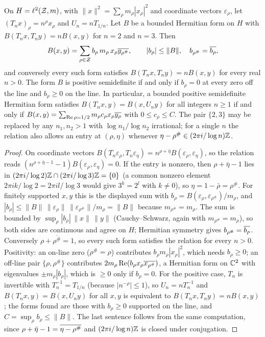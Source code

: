\begin{lemma}\label{lem:PTQ}
On $H=\ell^2(\mathcal{Z},m)$, with $\|x\|^2=\sum_\rho m_\rho|x_\rho|^2$ and coordinate vectors $\varepsilon_\rho$, let $(T_nx)_\rho=n^\rho x_\rho$ and $U_n=nT_{1/n}$. Let $B$ be a bounded Hermitian form on $H$ with $B(T_nx,T_ny)=nB(x,y)$ for $n=2$ and $n=3$. Then
\[
B(x,y)=\sum_{\rho\in\mathcal{Z}}b_\rho\,m_\rho\,x_\rho\overline{y_{\rho^\#}},\qquad|b_\rho|\le\|B\|,\quad b_{\rho^\#}=\overline{b_\rho},
\]
and conversely every such form satisfies $B(T_nx,T_ny)=nB(x,y)$ for every real $n>0$. The form $B$ is positive semidefinite if and only if $b_\rho=0$ at every zero off the line and $b_\rho\ge0$ on the line. In particular, a bounded positive semidefinite Hermitian form satisfies $B(T_nx,y)=B(x,U_ny)$ for all integers $n\ge1$ if and only if $B(x,y)=\sum_{\operatorname{Re}\rho=1/2}m_\rho c_\rho x_\rho\overline{y_\rho}$ with $0\le c_\rho\le C$.
The pair $\{2,3\}$ may be replaced by any $n_1,n_2>1$ with $\log n_1/\log n_2$ irrational; for a single $n$ the relation also allows an entry at $(\rho,\eta)$ whenever $\eta-\rho^\#\in(2\pi i/\log n)\mathbb{Z}$.
\end{lemma}

\begin{proof}
On coordinate vectors $B(T_n\varepsilon_\rho,T_n\varepsilon_\eta)=n^{\rho+\bar\eta}B(\varepsilon_\rho,\varepsilon_\eta)$, so the relation reads $(n^{\rho+\bar\eta-1}-1)B(\varepsilon_\rho,\varepsilon_\eta)=0$. If the entry is nonzero, then $\rho+\bar\eta-1$ lies in $(2\pi i/\log2)\mathbb{Z}\cap(2\pi i/\log3)\mathbb{Z}=\{0\}$ (a common nonzero element $2\pi ik/\log2=2\pi il/\log3$ would give $3^k=2^l$ with $k\ne0$), so $\eta=1-\bar\rho=\rho^\#$. For finitely supported $x,y$ this is the displayed sum with $b_\rho=B(\varepsilon_\rho,\varepsilon_{\rho^\#})/m_\rho$, and $|b_\rho|\le\|B\|\,\|\varepsilon_\rho\|\,\|\varepsilon_{\rho^\#}\|/m_\rho=\|B\|$ because $m_{\rho^\#}=m_\rho$. The sum is bounded by $\sup_\rho|b_\rho|\,\|x\|\,\|y\|$ (Cauchy--Schwarz, again with $m_{\rho^\#}=m_\rho$), so both sides are continuous and agree on $H$; Hermitian symmetry gives $b_{\rho^\#}=\overline{b_\rho}$. Conversely $\rho+\overline{\rho^\#}=1$, so every such form satisfies the relation for every $n>0$.
Positivity: an on-line zero ($\rho^\#=\rho$) contributes $b_\rho m_\rho|x_\rho|^2$, which needs $b_\rho\ge0$; an off-line pair $\{\rho,\rho^\#\}$ contributes $2m_\rho\operatorname{Re}(b_\rho x_\rho\overline{x_{\rho^\#}})$, a Hermitian form on $\mathbb{C}^2$ with eigenvalues $\pm m_\rho|b_\rho|$, which is $\ge0$ only if $b_\rho=0$.
For the positive case, $T_n$ is invertible with $T_n^{-1}=T_{1/n}$ (because $|n^{-\rho}|\le1$), so $U_n=nT_n^{-1}$ and $B(T_nx,y)=B(x,U_ny)$ for all $x,y$ is equivalent to $B(T_nx,T_ny)=nB(x,y)$; the forms found are those with $b_\rho\ge0$ supported on the line, and $C=\sup_\rho b_\rho\le\|B\|$. The last sentence follows from the same computation, since $\rho+\bar\eta-1=\overline{\eta-\rho^\#}$ and $(2\pi i/\log n)\mathbb{Z}$ is closed under conjugation.
\end{proof}

